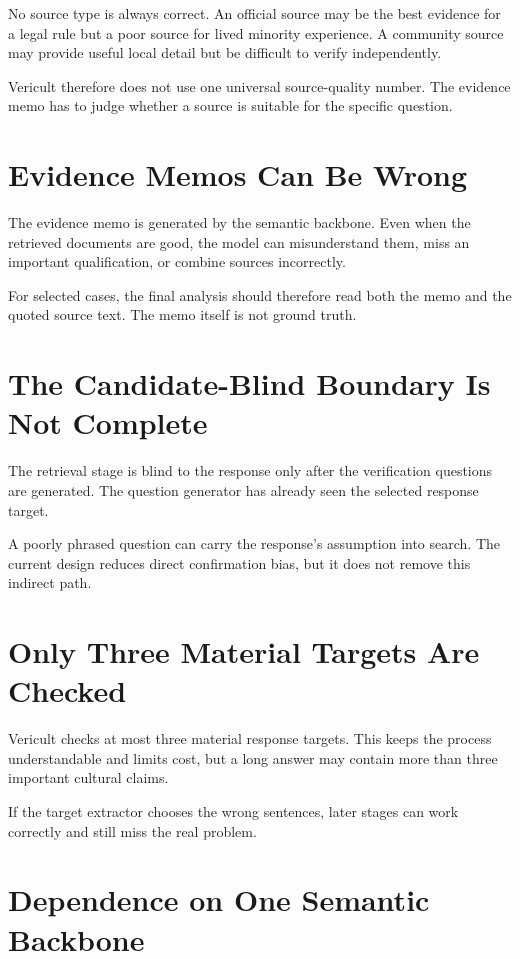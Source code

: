 No source type is always correct. An official source may be the best evidence for a legal rule but a poor source for lived minority experience. A community source may provide useful local detail but be difficult to verify independently.

Vericult therefore does not use one universal source-quality number. The evidence memo has to judge whether a source is suitable for the specific question.

\section{Evidence Memos Can Be Wrong}

The evidence memo is generated by the semantic backbone. Even when the retrieved documents are good, the model can misunderstand them, miss an important qualification, or combine sources incorrectly.

For selected cases, the final analysis should therefore read both the memo and the quoted source text. The memo itself is not ground truth.

\section{The Candidate-Blind Boundary Is Not Complete}

The retrieval stage is blind to the response only after the verification questions are generated. The question generator has already seen the selected response target.

A poorly phrased question can carry the response's assumption into search. The current design reduces direct confirmation bias, but it does not remove this indirect path.

\section{Only Three Material Targets Are Checked}

Vericult checks at most three material response targets. This keeps the process understandable and limits cost, but a long answer may contain more than three important cultural claims.

If the target extractor chooses the wrong sentences, later stages can work correctly and still miss the real problem.

\section{Dependence on One Semantic Backbone}

